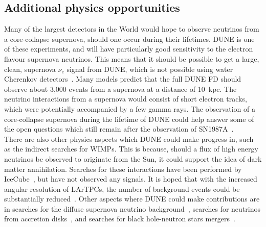 \subsection{Additional physics opportunities} \label{sec:DUNE_Other}%
Many of the largest detectors in the World would hope to observe neutrinos from a core-collapse supernova, should one occur during their lifetimes. DUNE is one of these experiments, and will have particularly good sensitivity to the electron flavour supernova neutrinos. This means that it should be possible to get a large, clean, supernova $\nu_e$ signal from DUNE, which is not possible using water Cherenkov detectors~\citep{KScholSND, Laha:2013hva}. Many models predict that the full DUNE FD should observe about 3,000 events from a supernova at a distance of 10~kpc. The neutrino interactions from a supernova would consist of short electron tracks, which were potentially accompanied by a few gamma rays. The observation of a core-collapse supernova during the lifetime of DUNE could help answer some of the open questions which still remain after the observation of SN1987A~\citep{PhysRevLett.58.1494, PhysRevLett.58.1490}. \\

There are also other physics aspects which DUNE could make progress in, such as the indirect searches for WIMPs. This is because, should a flux of high energy neutrinos be observed to originate from the Sun, it could support the idea of dark matter annihilation. Searches for these interactions have been performed by IceCube~\citep{Aartsen:2012kia, Choi:2015ara}, but have not observed any signals. It is hoped that with the increased angular resolution of LArTPCs, the number of background events could be substantially reduced~\citep{DUNECDR_V2}. Other aspects where DUNE could make contributions are in searches for the diffuse supernova neutrino background~\citep{Beacom:2010kk}, searches for neutrinos from accretion disks~\citep{Caballero:2011dw}, and searches for black hole-neutron stars mergers~\citep{Caballero:2009ww}. \\

